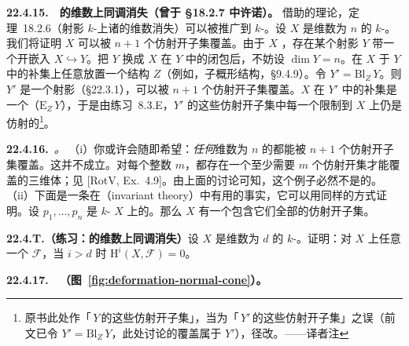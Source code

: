 \textbf{22.4.15.}\ \hard\ \textbf{\trQuasiprojective\trScheme{}的维数上同调消失（曾于 \S18.2.7 中许诺）。}\quad
借助\trBlowup{}的理论，\mbox{定理~18.2.6}（射影 $k$-\trScheme{}上诸\trQCSheaf{}的维数\trCohomology{}消失）可以被推广到\trQuasiprojective{} $k$-\trScheme。设 $X$ 是维数为 $n$ 的\trQuasiprojective{} $k$-\trVariety。我们将证明 $X$ 可以被 $n+1$ 个仿射开子集覆盖。由于 $X$ \trQuasiprojective，存在某个射影\trVariety{} $Y$ 带一个开嵌入 $X\hookrightarrow Y$。把 $Y$ 换成 $X$ 在 $Y$ 中的闭包后，不妨设 $\dim Y=n$。在 $X$ 于 $Y$ 中的补集上任意放置一个\trSubscheme{}结构 $Z$（例如，\trReduced{}子概形结构，\S9.4.9）。令 $Y'=\mathrm{Bl}_Z\,Y$。则 $Y'$ 是一个射影\trVariety{}（\S22.3.1），可以被 $n+1$ 个仿射开子集覆盖。$X$ 在 $Y'$ 中的补集是一个\trEffectiveCartierDivisor{}（$\mathrm{E}_Z\,Y$），于是由\mbox{练习~8.3.E}，$Y'$ 的这些仿射开子集中每一个限制到 $X$ 上仍是仿射的\footnote{原书此处作「\,$Y$\,的这些仿射开子集」，当为「\,$Y'$\,的这些仿射开子集」之误（前文已令 $Y'=\mathrm{Bl}_Z\,Y$，此处讨论的覆盖属于 $Y'$），径改。——译者注}。

\textbf{22.4.16.}\ \emph{\trhRemark。}\quad
（i）你或许会随即希望：\emph{任何}维数为 $n$ 的\trVariety{}都能被 $n+1$ 个仿射开子集覆盖。这并不成立。对每个整数 $m$，都存在一个至少需要 $m$ 个仿射开集才能覆盖的三维体；见 [RotV, Ex.~4.9]。由上面的讨论可知，这个例子必然不是\trQuasiprojective{}的。
（ii）下面是一条在\trInvariantTheory（invariant theory）中有用的事实，它可以用同样的方式证明。设 $p_1,\dots,p_n$ 是\trQuasiprojective{} $k$-\trVariety{} $X$ 上的\trClosedPoint。那么 $X$ 有一个包含它们全部的仿射开子集。

\textbf{22.4.T.（练习：\trQuasiprojective\trVariety{}的维数上同调消失）}\quad 设 $X$ 是维数为 $d$ 的\trQuasiprojective{} $k$-\trScheme。证明：对 $X$ 上任意一个\trQC{}\trSheaf{} $\mathscr{F}$，当 $i>d$ 时 $\mathrm{H}^i(X,\mathscr{F})=0$。

\textbf{22.4.17.}\ \extrahard\ \textbf{\trDeformationToTheNormalCone（图~\ref{fig:deformation-normal-cone}）。}

